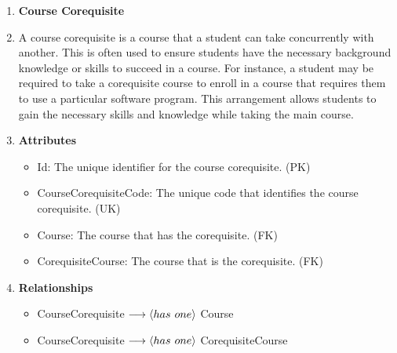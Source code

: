 \documentclass[12pt]{article}
\begin{document}
\begin{appendices}
\begin{enumerate}[label=(\roman*)]
    \item \textbf{Course Corequisite}
    \item[] A course corequisite is a course that a student can take concurrently with another. This is often used to ensure students have the necessary background knowledge or skills to succeed in a course. For instance, a student may be required to take a corequisite course to enroll in a course that requires them to use a particular software program. This arrangement allows students to gain the necessary skills and knowledge while taking the main course.
    \item[] \textbf{Attributes}
    \begin{itemize}
        \item Id: The unique identifier for the course corequisite. (PK)
        \item CourseCorequisiteCode: The unique code that identifies the course corequisite. (UK)
        \item Course: The course that has the corequisite. (FK)
        \item CorequisiteCourse: The course that is the corequisite. (FK)
    \end{itemize}
    \item[] \textbf{Relationships}
    \begin{itemize}
        \item CourseCorequisite $ \longrightarrow \langle has \hspace{0.125cm} one \rangle $ Course
        \item CourseCorequisite $ \longrightarrow \langle has \hspace{0.125cm} one \rangle $ CorequisiteCourse
    \end{itemize}


\end{enumerate}
\end{appendices}
\end{document}
